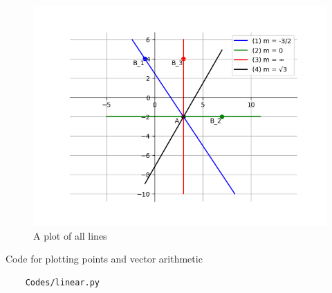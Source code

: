 \documentclass[journal]{IEEEtran}
\begin{document}
\begin{figure}[H]
	\centering
	\includegraphics[width=0.75\columnwidth]{Figures/Figure.png}
	\caption{A plot of all lines}
	\label{fig}
\end{figure}

Code for plotting points and vector arithmetic
\begin{lstlisting}
	Codes/linear.py
\end{lstlisting}

\renewcommand{\thefigure}{\theenumi}
\renewcommand{\thetable}{\theenumi}
\end{document}
